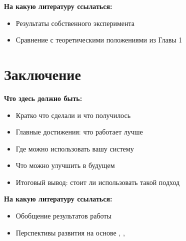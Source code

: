 \documentclass[a4paper,14pt]{extarticle}
\begin{document}
\textbf{На какую литературу ссылаться:}
\begin{itemize}
\item Результаты собственного эксперимента
\item Сравнение с теоретическими положениями из Главы 1
\end{itemize}

\section*{Заключение}

\textbf{Что здесь должно быть:}
\begin{itemize}
\item Кратко что сделали и что получилось
\item Главные достижения: что работает лучше
\item Где можно использовать вашу систему
\item Что можно улучшить в будущем
\item Итоговый вывод: стоит ли использовать такой подход
\end{itemize}

\textbf{На какую литературу ссылаться:}
\begin{itemize}
\item Обобщение результатов работы
\item Перспективы развития на основе \cite{5}, \cite{6}, \cite{7}
\end{itemize}

\newpage
\end{document}
